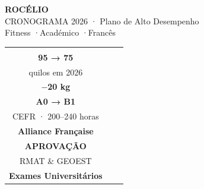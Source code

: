 \documentclass[a4paper,11pt]{article}
\begin{document}
\thispagestyle{empty}

\pagecolor{dark}
\color{white}

\vspace*{2cm}
\begin{center}
  {\fontsize{48}{52}\selectfont\bfseries\color{accent} ROCÉLIO}\\[6pt]
  {\Large\color{silver} CRONOGRAMA 2026 · Plano de Alto Desempenho}\\[30pt]
  {\normalsize\color{silver} Fitness \quad·\quad Académico \quad·\quad Francês}
\end{center}

\vspace{1.5cm}

\begin{center}
\end{center}

\vspace{1cm}

\begin{center}
\begin{tabular}{ccc}
  \begin{minipage}{4cm}
    \centering
    \begin{tcolorbox}[metricbox, width=4cm]
      \centering
      {\Large\bfseries FITNESS}\\[4pt]
      {\color{accent}\huge\bfseries 95 → 75}\\
      {\small quilos em 2026}\\[2pt]
      {\color{accent}\bfseries $-$20 kg}
    \end{tcolorbox}
  \end{minipage}
  &
  \begin{minipage}{4cm}
    \centering
    \begin{tcolorbox}[metricbox, width=4cm]
      \centering
      {\Large\bfseries FRANCÊS}\\[4pt]
      {\color{accent}\huge\bfseries A0 → B1}\\
      {\small CEFR · 200--240 horas}\\[2pt]
      {\color{gold}\bfseries Alliance Française}
    \end{tcolorbox}
  \end{minipage}
  &
  \begin{minipage}{4cm}
    \centering
    \begin{tcolorbox}[metricbox, width=4cm]
      \centering
      {\Large\bfseries ACADÉMICO}\\[4pt]
      {\color{accent}\huge\bfseries APROVAÇÃO}\\
      {\small RMAT \& GEOEST}\\[2pt]
      {\color{gold}\bfseries Exames Universitários}
    \end{tcolorbox}
  \end{minipage}
\end{tabular}
\end{center}
\end{document}
